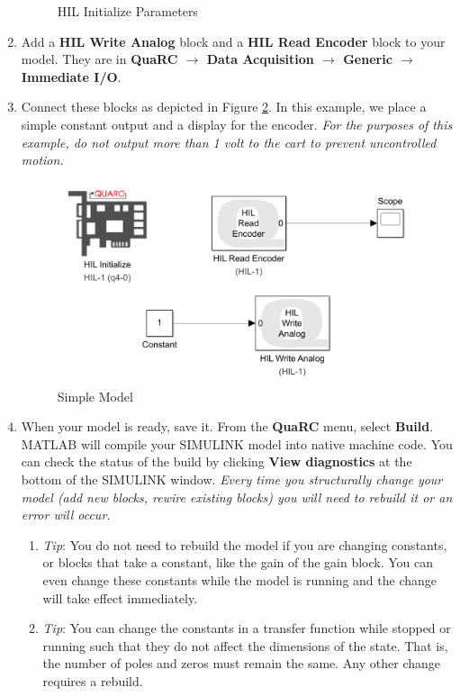 \documentclass[11pt,letterpaper]{article}
\newcommand{\baro}{\pmb{\rightarrow}}
\begin{document}
\begin{enumerate}
\begin{figure}[H]
    \caption{HIL Initialize Parameters}
    \label{fig:HIL_init_params}
  \end{figure}
  \item Add a \textbf{HIL Write Analog} block and a \textbf{HIL Read Encoder} block to your model. They are in \textbf{QuaRC $\baro$ Data Acquisition $\baro$ Generic $\baro$ Immediate I/O}.
  \item Connect these blocks as depicted in Figure \ref{fig:simple_model}. In this example, we place a simple constant output and a display for the encoder. \textit{For the purposes of this example, do not output more than 1 volt to the cart to prevent uncontrolled motion.}
  \begin{figure}[H]
    \centering 
    \includegraphics[width=.8\textwidth]{Figures/fig5_simplemodel.png}
    \caption{Simple Model}
    \label{fig:simple_model}
  \end{figure}
  \item When your model is ready, save it. From the \textbf{QuaRC} menu, select \textbf{Build}. MATLAB will compile your SIMULINK model into native machine code. You can check the status of the build by clicking \textbf{View diagnostics} at the bottom of the SIMULINK window. \textit{Every time you structurally change your model (add new blocks, rewire existing blocks) you will need to rebuild it or an error will occur.} 
  \begin{enumerate}
    \item \textit{Tip}: You do not need to rebuild the model if you are changing constants, or blocks that take a constant, like the gain of the gain block. You can even change these constants while the model is running and the change will take effect immediately. 
    \item \textit{Tip}: You can change the constants in a transfer function while stopped or running such that they do not affect the dimensions of the state. That is, the number of poles and zeros must remain the same. Any other change requires a rebuild.

\end{enumerate}
\end{enumerate}
\end{document}
